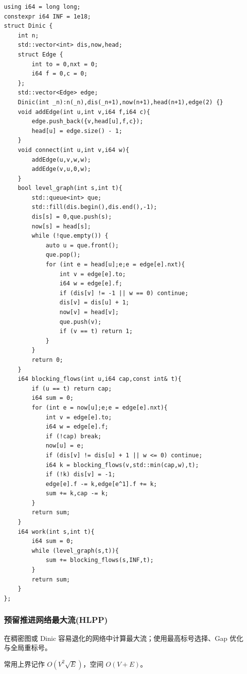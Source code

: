 \begin{lstlisting}
using i64 = long long;
constexpr i64 INF = 1e18;
struct Dinic {
    int n;
    std::vector<int> dis,now,head;
    struct Edge {
        int to = 0,nxt = 0;
        i64 f = 0,c = 0;
    };
    std::vector<Edge> edge;
    Dinic(int _n):n(_n),dis(_n+1),now(n+1),head(n+1),edge(2) {}
    void addEdge(int u,int v,i64 f,i64 c){
        edge.push_back({v,head[u],f,c});
        head[u] = edge.size() - 1;
    }
    void connect(int u,int v,i64 w){
        addEdge(u,v,w,w);
        addEdge(v,u,0,w);
    }
    bool level_graph(int s,int t){
        std::queue<int> que;
        std::fill(dis.begin(),dis.end(),-1);
        dis[s] = 0,que.push(s);
        now[s] = head[s];
        while (!que.empty()) {
            auto u = que.front();
            que.pop();
            for (int e = head[u];e;e = edge[e].nxt){
                int v = edge[e].to;
                i64 w = edge[e].f;
                if (dis[v] != -1 || w == 0) continue;
                dis[v] = dis[u] + 1;
                now[v] = head[v];
                que.push(v);
                if (v == t) return 1;
            }
        }
        return 0;
    }
    i64 blocking_flows(int u,i64 cap,const int& t){
        if (u == t) return cap;
        i64 sum = 0;
        for (int e = now[u];e;e = edge[e].nxt){
            int v = edge[e].to;
            i64 w = edge[e].f;
            if (!cap) break;
            now[u] = e;
            if (dis[v] != dis[u] + 1 || w <= 0) continue;
            i64 k = blocking_flows(v,std::min(cap,w),t);
            if (!k) dis[v] = -1;
            edge[e].f -= k,edge[e^1].f += k;
            sum += k,cap -= k;
        }
        return sum;
    }
    i64 work(int s,int t){
        i64 sum = 0;
        while (level_graph(s,t)){
            sum += blocking_flows(s,INF,t);
        }
        return sum;
    }
};
\end{lstlisting}

\subsubsection{预留推进网络最大流(HLPP)}

在稠密图或 Dinic 容易退化的网络中计算最大流；使用最高标号选择、Gap 优化与全局重标号。

常用上界记作 $O(V^2\sqrt E)$，空间 $O(V+E)$。

